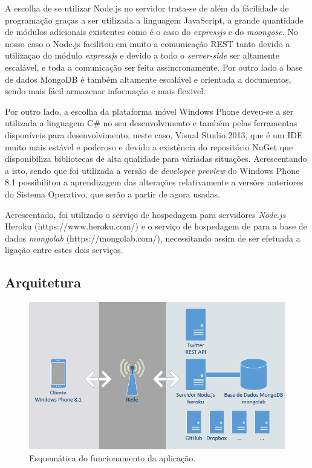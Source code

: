 \documentclass[12pt]{article}
\begin{document}
	A escolha de se utilizar Node.js no servidor trata-se de além da fácilidade de programação graças a ser utilizada a linguagem JavaScript, a grande quantidade de módulos adicionais existentes como é o caso do \textit{expressjs} e do \textit{moongose}.	 No nosso caso o Node.js facilitou em muito a comunicação REST tanto devido a utilizaçao do módulo \textit{expressjs} e devido a todo o \textit{server-side} ser altamente escalável, e toda a comunicação ser feita assincronamente. Por outro lado a base de dados MongoDB é também altamente escalável e orientada a documentos, sendo mais fácil armazenar informação e mais flexivel. 
	
	Por outro lado, a escolha da plataforma móvel Windows Phone deveu-se a ser utilizada a linguagem C\# no seu desenvolvimento e também pelas ferramentas disponíveis para desenvolvimento, neste caso, Visual Studio 2013, que é um IDE muito mais estável e poderoso e devido a existência do repositório NuGet que disponibiliza bibliotecas de alta qualidade para váriadas situações. Acrescentando a isto, sendo que foi utilizada a versão de \textit{developer preview} do Windows Phone 8.1 possibilitou a aprendizagem das alterações relativamente a versões anteriores do Sistema Operativo, que serão a partir de agora usadas.
	
	Acrescentado, foi utilizado o serviço de hospedagem para servidores \textit{Node.js} Heroku (https://www.heroku.com/)  e o serviço de hospedagem de para a base de dados \textit{mongolab}  (https://mongolab.com/), necessitando assim de ser efetuada a ligação entre estes dois serviços.
	
\subsection{Arquitetura}	
\begin{figure}
 \centering
\includegraphics[scale=0.75]{rede.png}
 \caption{Esquemática do funcionamento da aplicação.}
 \label{figure:example}
\end{figure}
\end{document}
